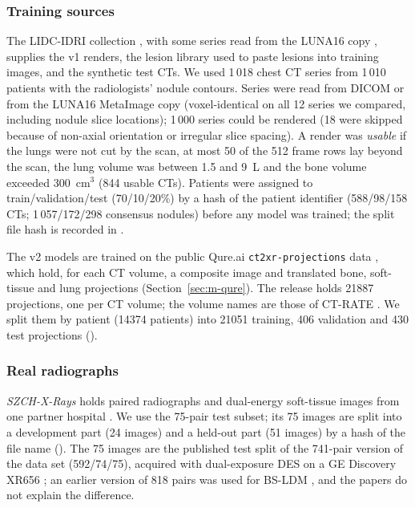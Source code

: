 \subsubsection{Training sources}
The LIDC-IDRI collection \cite{armato2011lidc,armato2015lidctcia,clark2013tcia}, with some series read from the LUNA16 copy
\cite{setio2017luna16}, supplies the v1 renders, the lesion library used to paste lesions into training images, and the synthetic test CTs.
We used 1\,018 chest CT series from 1\,010 patients with the radiologists' nodule contours. Series were read from DICOM or from the LUNA16
MetaImage copy (voxel-identical on all 12 series we compared, including nodule slice locations); 1\,000 series could be rendered (18 were
skipped because of non-axial orientation or irregular slice spacing). A render was \emph{usable} if the lungs were not cut by the scan, at
most 50 of the 512 frame rows lay beyond the scan, the lung volume was between 1.5 and 9~L and the bone volume exceeded 300~cm$^3$ (844
usable CTs). Patients were assigned to train/validation/test (70/10/20\%) by a hash of the patient identifier (588/98/158 CTs;
1\,057/172/298 consensus nodules) before any model was trained; the split file hash is recorded in .

The v2 models are trained on the public Qure.ai \texttt{ct2xr-projections} data \cite{angaitkar2026anatomy}, which hold, for each CT
volume, a composite image and translated bone, soft-tissue and lung projections (Section~\ref{sec:m-qure}). The release holds \num{21887}
projections, one per CT volume; the volume names are those of CT-RATE \cite{hamamci2026ctrate}. We split them by patient (\num{14374}
patients) into \num{21051} training, 406 validation and 430 test projections ().

\subsubsection{Real radiographs}
\emph{SZCH-X-Rays} holds paired radiographs and dual-energy soft-tissue images from one partner hospital \cite{sun2026bsldm,sun2026debonedit}.
We use the 75-pair test subset; its 75 images are split into a development part (24 images) and a held-out part (51 images) by a hash of
the file name (). The 75 images are the published test split of the 741-pair version of the data set
(592/74/75), acquired with dual-exposure DES on a GE Discovery XR656 \cite{sun2026debonedit}; an earlier version of 818 pairs was used for
BS-LDM \cite{sun2026bsldm}, and the papers do not explain the difference.

